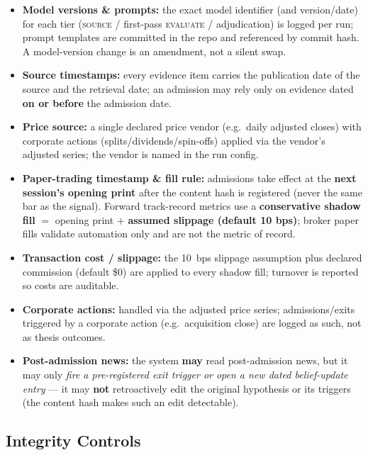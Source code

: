 \documentclass[11pt]{article}
\begin{document}
\begin{itemize}
  \item \textbf{Model versions \& prompts:} the exact model identifier (and version/date) for
    each tier (\textsc{source} / first-pass \textsc{evaluate} / adjudication) is logged per run;
    prompt templates are committed in the repo and referenced by commit hash. A model-version
    change is an amendment, not a silent swap.
  \item \textbf{Source timestamps:} every evidence item carries the publication date of the
    source and the retrieval date; an admission may rely only on evidence dated \textbf{on or
    before} the admission date.
  \item \textbf{Price source:} a single declared price vendor (e.g.\ daily adjusted closes) with
    corporate actions (splits/dividends/spin-offs) applied via the vendor's adjusted series; the
    vendor is named in the run config.
  \item \textbf{Paper-trading timestamp \& fill rule:} admissions take effect at the \textbf{next
    session's opening print} after the content hash is registered (never the same bar as the
    signal). Forward track-record metrics use a \textbf{conservative shadow fill} $=$ opening
    print $+$ \textbf{assumed slippage (default 10 bps)}; broker paper fills validate automation
    only and are not the metric of record.
  \item \textbf{Transaction cost / slippage:} the 10~bps slippage assumption plus declared
    commission (default \$0) are applied to every shadow fill; turnover is reported so costs are
    auditable.
  \item \textbf{Corporate actions:} handled via the adjusted price series; admissions/exits
    triggered by a corporate action (e.g.\ acquisition close) are logged as such, not as thesis
    outcomes.
  \item \textbf{Post-admission news:} the system \textbf{may} read post-admission news, but it
    may only \emph{fire a pre-registered exit trigger or open a new dated belief-update entry}
    --- it may \textbf{not} retroactively edit the original hypothesis or its triggers (the
    content hash makes such an edit detectable).
\end{itemize}

\subsection*{Integrity Controls}
\end{document}
